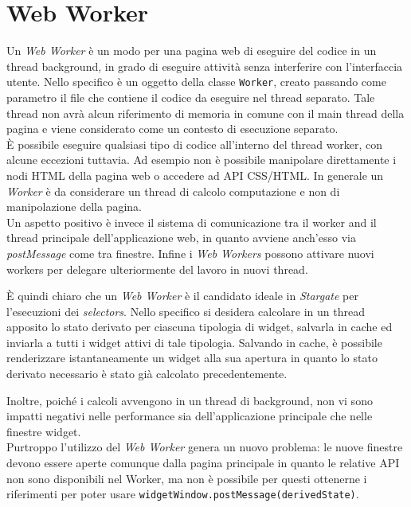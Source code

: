 \section{Web Worker}

Un \textit{Web Worker} è un modo per una pagina web di eseguire del codice in un thread background, in grado di eseguire attività senza interferire con l'interfaccia utente. Nello specifico è un oggetto della classe \texttt{Worker}, creato passando come parametro il file che contiene il codice da eseguire nel thread separato. Tale thread non avrà alcun riferimento di memoria in comune con il main thread della pagina e viene considerato come un contesto di esecuzione separato. \\

È possibile eseguire qualsiasi tipo di codice all'interno del thread worker, con alcune eccezioni tuttavia. Ad esempio non è possibile manipolare direttamente i nodi HTML della pagina web o accedere ad API CSS/HTML. In generale un \textit{Worker} è da considerare un thread di calcolo computazione e non di manipolazione della pagina. \\

Un aspetto positivo è invece il sistema di comunicazione tra il worker and il thread principale dell'applicazione web, in quanto avviene anch'esso via \textit{postMessage} come tra finestre. Infine i \textit{Web Workers} possono attivare nuovi workers per delegare ulteriormente del lavoro in nuovi thread.

È quindi chiaro che un \textit{Web Worker} è il candidato ideale in \textit{Stargate} per l'esecuzioni dei \textit{selectors}. Nello specifico si desidera calcolare in un thread apposito lo stato derivato per ciascuna tipologia di widget, salvarla in cache ed inviarla a tutti i widget attivi di tale tipologia. Salvando in cache, è possibile renderizzare istantaneamente un widget alla sua apertura in quanto lo stato derivato necessario è stato già calcolato precedentemente.

Inoltre, poiché i calcoli avvengono in un thread di background, non vi sono impatti negativi nelle performance sia dell'applicazione principale che nelle finestre widget. \\

Purtroppo l'utilizzo del \textit{Web Worker} genera un nuovo problema: le nuove finestre devono essere aperte comunque dalla pagina principale in quanto le relative API non sono disponibili nel Worker, ma non è possibile per questi ottenerne i riferimenti per poter usare \texttt{widgetWindow.postMessage(derivedState)}. 

